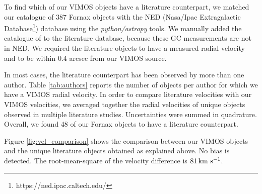 \documentclass[useAMS,usenatbib]{mn2e}
\newcommand{\kms}{\mbox{\,km~s$^{-1}$}}
\begin{document}
To find which of our VIMOS objects have a literature counterpart, we matched 
our catalogue of 387 Fornax objects with the NED (Nasa/Ipac Extragalactic 
Database\footnote{https://ned.ipac.caltech.edu/}) database using the 
{\it python/astropy} tools. 
We manually added the catalogue of \citet{Schuberth} to the literature 
database, because these GC measurements are not in NED. We required the 
literature objects to have a measured radial velocity and to be within 0.4 
arcsec from our VIMOS source. 

In most cases, the literature counterpart has been observed by more than one 
author. Table \ref{tab:authors} reports the number of objects per author for 
which we have a VIMOS radial velocity. 
In order to compare literature velocities with our VIMOS velocities, we 
averaged together the radial velocities of unique objects observed in multiple 
literature studies. Uncertainties were summed in quadrature. 
Overall, we found 48 of our Fornax objects to have a literature counterpart. 

Figure \ref{fig:vel_comparison} shows the comparison between our VIMOS 
objects and the unique literature objects obtained as explained above. No 
bias is detected. The root-mean-square of the velocity difference is $81 \kms$. 


\end{document}
